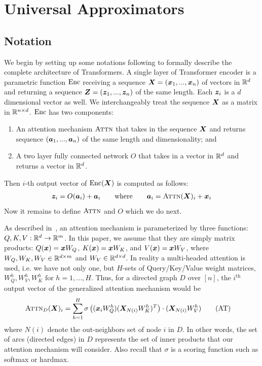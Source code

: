 \newcommand{\Gdpos}{\ensuremath{\mathbf{G}^{E}_{\delta}}}
\newcommand{\FCDpos}{\ensuremath{\mathcal{F}^{E}_{CD}}}
\newcommand{\tx}{\ensuremath{\tilde{x}}}
\newcommand{\tl}{\ensuremath{\tilde{f}}}

\section{Universal Approximators} \label{sec:apndx-universal}

\subsection{Notation}
\label{sec:apndx-enc-notation}
We begin by setting up some notations following \citet{Perez19} to formally describe the complete architecture of Transformers. 
A single layer of Transformer encoder is a parametric function $\operatorname{Enc}$ receiving a sequence ${\bm{X}} = ({\bm{x}}_1, ..., {\bm{x}}_n)$ of vectors in $\mathbb{R}^d$ and returning a sequence ${\bm{Z}} = ({\bm{z}}_1, ..., {\bm{z}}_n)$ of the same length.
Each ${\bm{z}}_i$ is a $d$ dimensional vector as well.
We interchangeably treat the sequence ${\bm{X}}$ as a matrix in $\mathbb{R}^{n\times d}$.
$\operatorname{Enc}$ has two components: 
%
\begin{enumerate}[leftmargin=6mm, itemsep=2mm, partopsep=0pt,parsep=0pt]
    \item An attention mechanism $\textsc{Attn}$ that takes in the sequence ${\bm{X}}$ and returns sequence $({\bm{a}}_1, ..., {\bm{a}}_n)$ of the same length and dimensionality; and 
    \item A two layer fully connected network $O$ that takes in a vector in $\mathbb{R}^d$ and returns a vector in $\mathbb{R}^d$. 
\end{enumerate}
Then $i$-th output vector of $\operatorname{Enc}({\bm{X}})$ is computed as follows:
\begin{align}
    {\bm{z}}_i = O({\bm{a}}_i) + {\bm{a}}_i \qquad\text{where}\qquad {\bm{a}}_i = \textsc{Attn}({\bm{X}})_i + {\bm{x}}_i
\end{align}
%
Now it remains to define $\textsc{Attn}$ and $O$ which we do next.

As described in~, an attention mechanism is parameterized by three functions: $Q,K,V: \mathbb{R}^{d} \to \mathbb{R}^{m}$. 
In this paper, we assume that they are simply matrix products: $Q({\bm{x}}) = {\bm{x}} W_Q $, 
$K({\bm{x}}) = {\bm{x}} W_K $, and $V({\bm{x}}) = {\bm{x}} W_V $, where $W_Q, W_K, W_V \in \mathbb{R}^{d \times m}$ and 
$W_V\in \mathbb{R}^{d \times d}$.
In reality a multi-headed attention is used, i.e. we have not only one,
but $H$-sets of Query/Key/Value weight matrices, $W_Q^h, W_V^h, W_K^h \text{ for }h=1,...,H$.
Thus, for a directed graph $D$ over $[n]$, the $i^\text{th}$ output vector of the generalized attention mechanism would be
\begin{align}
\textsc{Attn}_D({\bm{X}})_i &=  \sum_{h=1}^H \sigma \left(({\bm{x}}_i W_Q^h) ({\bm{X}}_{N(i)} W_K^h)^T  \right) \cdot ({\bm{X}}_{N(i)} W_V^h ) \label{AT_app} \tag{AT}
\end{align}
where $N(i)$ denote the out-neighbors set of node $i$ in $D$.
In other words, the set of arcs (directed edges) in $D$ represents the set of inner products that our attention mechanism will consider.
Also recall that $\sigma$ is a scoring function such as softmax or hardmax. 


